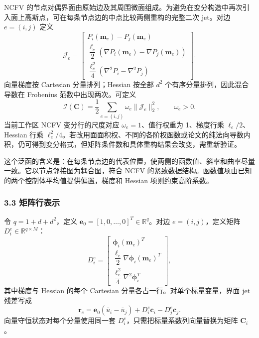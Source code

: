 \documentclass[
  12pt,
  UTF8]{ctexart}
\begin{document}
NCFV
的节点对偶界面由原始边及其周围微面组成。为避免在变分构造中再次引入面上高斯点，可在每条节点边的中点比较两侧重构的完整二次
jet。对边 \(e=(i,j)\) 定义 \begin{equation}
\mathcal J_e=
\begin{bmatrix}
P_i(\boldsymbol m_e)-P_j(\boldsymbol m_e)\\[1mm]
\dfrac{\ell_e}{2}\left(\nabla P_i(\boldsymbol m_e)-\nabla P_j(\boldsymbol m_e)\right)\\[1mm]
\dfrac{\ell_e^2}{4}\left(\nabla^2P_i-\nabla^2P_j\right)
\end{bmatrix}.\end{equation} 向量梯度按 Cartesian 分量排列；Hessian 按全部 \(d^2\)
个有序分量排列，因此混合导数在 Frobenius 范数中出现两次。可定义 \begin{equation}
\boxed{\mathcal I(\boldsymbol C)=\frac12\sum_{e=(i,j)}\omega_e
\|\mathcal J_e\|_2^2,\qquad \omega_e>0.}\end{equation} 当前工作区 NCFV 变分行的尺度对应 \(\omega_e=1\)、值行权重为
1、梯度行乘 \(\ell_e/2\)、Hessian 行乘
\(\ell_e^2/4\)。若改用面面积权、不同的各阶权函数或论文的纯法向导数内积，仍可得到变分格式，但矩阵条件数和具体重构结果会改变，需重新验证。

这个泛函的含义是：在每条节点边的代表位置，使两侧的函数值、斜率和曲率尽量一致。它以节点邻接图为耦合图，符合
NCFV 的紧致数据结构。函数值项由已知的两个控制体平均值提供偏置，梯度和
Hessian 项则约束高阶系数。

\hypertarget{ux77e9ux9635ux884cux8868ux793a}{%
\subsubsection{3.3 矩阵行表示}\label{ux77e9ux9635ux884cux8868ux793a}}

令 \(q=1+d+d^2\)，定义
\(\boldsymbol e_0=[1,0,\ldots,0]^T\in\mathbb R^q\)。对边
\(e=(i,j)\)，定义矩阵 \(D_i^e\in\mathbb R^{q\times M}\)： \begin{equation}
D_i^e=
\begin{bmatrix}
\boldsymbol\phi_i(\boldsymbol m_e)^T\\
\dfrac{\ell_e}{2}\nabla\boldsymbol\phi_i(\boldsymbol m_e)^T\\
\dfrac{\ell_e^2}{4}\nabla^2\boldsymbol\phi_i^T
\end{bmatrix},\end{equation} 其中梯度与 Hessian 的每个 Cartesian
分量各占一行。对单个标量变量，界面 jet 残差写成 \begin{equation}
\boldsymbol r_e=\boldsymbol e_0(\bar u_i-\bar u_j)
+D_i^e\boldsymbol c_i-D_j^e\boldsymbol c_j.\end{equation} 向量守恒状态对每个分量使用同一套
\(D_i^e\)，只需把标量系数列向量替换为矩阵 \(\boldsymbol C_i\)。
\end{document}
